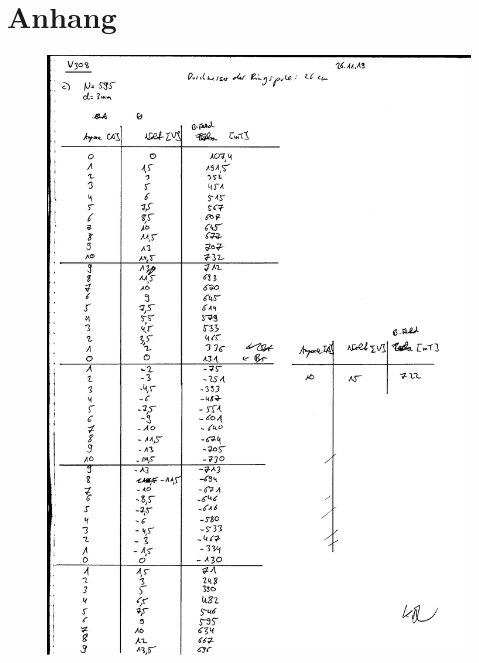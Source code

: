 \section{Anhang}
\begin{figure}[H]
\centering

    \includegraphics[width=\textwidth]{scan.pdf}
\end{figure}
